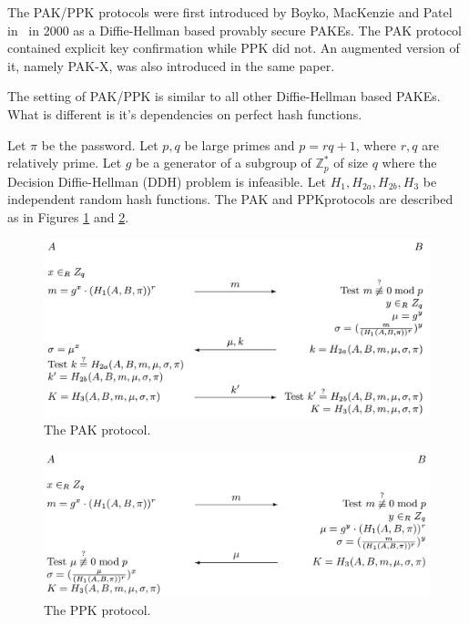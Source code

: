 

The PAK/PPK protocols were first introduced by Boyko, MacKenzie and Patel in~\cite{BoMaPa00} in 2000
as a Diffie-Hellman based provably secure PAKEs. The PAK protocol contained explicit key confirmation
while PPK did not. An augmented version of it, namely PAK-X, was also introduced in the same paper.

The setting of PAK/PPK is similar to all other Diffie-Hellman based PAKEs. What is different is it's dependencies on perfect hash functions.

Let $\pi$ be the password. Let $p, q$ be large primes and $p = rq+1$, where $r, q$ are relatively prime.
Let $g$ be a generator of a subgroup of $\mathbb{Z}^\ast_p$ of size $q$ where the Decision
Diffie-Hellman (DDH) problem is infeasible. Let $H_1, H_{2a}, H_{2b}, H_3$ be independent random hash 
functions. The PAK and PPKprotocols are described as in Figures \ref{fig:pak} and \ref{fig:ppk}. 

\begin{figure}[h]
    \centering
    \label{fig:pak}
    \includegraphics[scale=0.4]{pak_protocol.png}
    \caption{The PAK protocol.}
\end{figure}

\begin{figure}[h]
    \centering
    \label{fig:ppk}
    \includegraphics[scale=0.33]{ppk_protocol.png}
    \caption{The PPK protocol.}
\end{figure}

